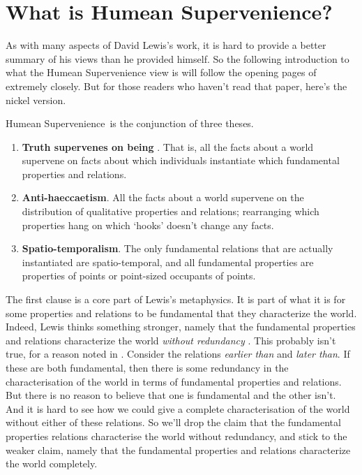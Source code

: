 \newcommand{\HS}{Hum\-e\-an Super\-ven\-i\-ence}

\section{What is \HS?}

As with many aspects of David Lewis's work, it is hard to provide a better summary of his views than he provided himself. So the following introduction to what the Humean Supervenience view is will follow the opening pages of \citet{Lewis1994a} extremely closely. But for those readers who haven't read that paper, here's the nickel version.

\HS\ is the conjunction of three theses.

\begin{enumerate}
\item \textbf{Truth supervenes on being} \citep{Bigelow1988}. That is, all the facts about a world supervene on facts about which individuals instantiate which fundamental properties and relations.
\item \textbf{Anti-haeccaetism}. All the facts about a world supervene on the distribution of qualitative properties and relations; rearranging which properties hang on which  `hooks' doesn't change any facts.
\item \textbf{Spatio-temporalism}. The only fundamental relations that are actually instantiated are spatio-temporal, and all fundamental properties are properties of points or point-sized occupants of points.
\end{enumerate}

\noindent The first clause is a core part of Lewis's metaphysics. It is part of what it is for some properties and relations to be fundamental that they characterize the world. Indeed, Lewis thinks something stronger, namely that the fundamental properties and relations characterize the world \textit{without redundancy} \citep[60]{Lewis1986a}. This probably isn't true, for a reason noted in \citet{SiderDiss}. Consider the relations \textit{earlier than} and \textit{later than}. If these are both fundamental, then there is some redundancy in the characterisation of the world in terms of fundamental properties and relations.  But there is no reason to believe  that one is fundamental and the other isn't. And it is hard to see how we could give a complete characterisation of the world without either of these relations. So we'll drop the claim that the fundamental properties relations characterise the world without redundancy, and stick to the weaker claim, namely that the fundamental properties and relations characterize the world completely.

